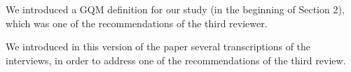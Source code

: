 
We introduced a GQM definition for our study (in the
beginning of Section 2), which was one of the
recommendations of the third reviewer. 


We introduced in this version of the paper several
transcriptions of the interviews, in order to
address one of the recommendations of the
third review.

